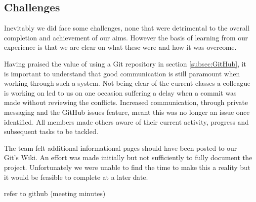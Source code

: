 \subsection{Challenges}
Inevitably we did face some challenges, none that were detrimental to the overall completion and achievement of our aims. However the basis of learning from our experience is that we are clear on what these were and how it was overcome. 

Having praised the value of using a Git repository in section \ref{subsec:GitHub}, it is important to understand that good communication is still paramount when working through such a system. Not being clear of the current classes a colleague is working on led to us on one occasion suffering a delay when a commit was made without reviewing the conflicts. Increased communication, through private messaging and the GitHub issues feature, meant this was no longer an issue once identified. All members made others aware of their current activity, progress and subsequent tasks to be tackled.

The team felt additional informational pages should have been posted to our Git's Wiki. An effort was made initially but not sufficiently to fully document the project. Unfortunately we were unable to find the time to make this a reality but it would be feasible to complete at a later date.

\todo refer to github (meeting minutes)
